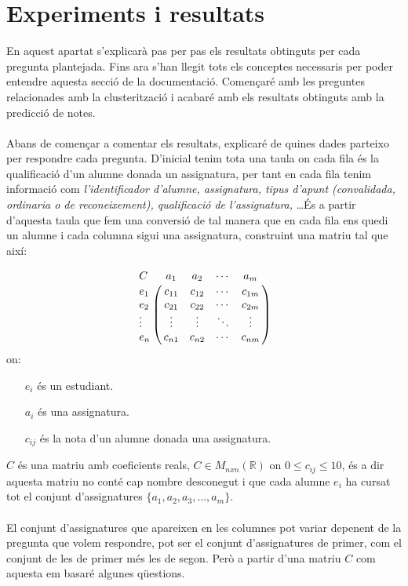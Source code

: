 \documentclass[12pt,a4paper,catalan]{article}
\begin{document}
\newpage

\section{Experiments i resultats}
En aquest apartat s'explicarà pas per pas els resultats obtinguts per cada pregunta plantejada. Fins ara s'han llegit tots els conceptes necessaris per poder entendre aquesta secció de la documentació. Començaré amb les preguntes relacionades amb la clusterització i acabaré amb els resultats obtinguts amb la predicció de notes.
\\
\\
Abans de començar a comentar els resultats, explicaré de quines dades parteixo per respondre cada pregunta. D'inicial tenim tota una taula on cada fila és la qualificació d'un alumne donada un assignatura, per tant en cada fila tenim informació com \textit{l'identificador d'alumne, assignatura, tipus d'apunt (convalidada, ordinaria o de reconeixement), qualificació de l'assignatura,} \ldots És a partir d'aquesta taula que fem una conversió de tal manera que en cada fila ens quedi un alumne i cada columna sigui una assignatura, construint una matriu tal que així:

$$
\bordermatrix{C &         a_1   &    a_2   &   \cdots    &    a_m  \cr
                  e_1    &  c_{11}  &  c_{12}  &   \cdots    &  c_{1m} \cr
                  e_2    &  c_{21}  &  c_{22}  &   \cdots    &  c_{2m}    \cr
                  \vdots &  \vdots  &  \vdots  &   \ddots    &  \vdots \cr
                  e_n    &  c_{n1}  &  c_{n2}  &   \cdots    &  c_{nm} \cr
                  }
$$
on:
\begin{itemize}[leftmargin=.5in]
	\item [$e_i$] és un estudiant.
	\item [$a_i$] és una assignatura.
	\item [$c_{ij}$] és la nota d'un alumne donada una assignatura.
\end{itemize}

$C$ és una matriu amb coeficients reals, $C\in M_{nxn} (\mathbb{R})$ on $0 \leq c_{ij} \leq 10$, és a dir aquesta matriu no conté cap nombre desconegut i que cada alumne $e_i$ ha cursat tot el conjunt d'assignatures $\{a_1, a_2, a_3, \ldots, a_m\}$.
\\
\\
El conjunt d'assignatures que apareixen en les columnes pot variar depenent de la pregunta que volem respondre, pot ser el conjunt d'assignatures de primer, com el conjunt de les de primer més les de segon. Però a partir d'una matriu $C$ com aquesta em basaré algunes qüestions.
\end{document}
